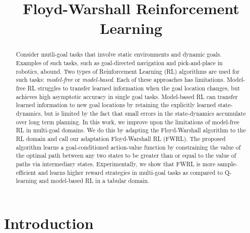 \documentclass[letterpaper]{article} %
\title{Floyd-Warshall Reinforcement Learning}
\begin{document}
\maketitle
\begin{abstract}
Consider mutli-goal tasks that involve static environments and dynamic
goals. Examples of such tasks, such as goal-directed navigation
and pick-and-place in robotics, abound.
Two types of Reinforcement Learning (RL) algorithms are used for
such tasks: 
\emph{model-free} or \emph{model-based}. Each of these approaches has limitations.
Model-free RL struggles to transfer learned information when the goal location
changes, but achieves high asymptotic accuracy in single goal tasks. Model-based
RL can transfer learned information to new goal locations by retaining the
explicitly learned state-dynamics, but is limited by the fact that small errors in
the state-dynamics accumulate over long term planning.
In this work, we improve upon the limitations of model-free RL in
multi-goal domains. 
We do this by adapting the Floyd-Warshall algorithm to
the RL domain and call our adaptation Floyd-Warshall RL (FWRL).
The proposed algorithm learns a goal-conditioned action-value function by 
constraining the value of the
optimal path between any two states to be greater than or equal to the value of
paths via intermediary states.
Experimentally, we show that FWRL is more sample-efficient and learns higher reward strategies in
multi-goal tasks as compared to Q-learning and model-based RL in a
tabular domain.



\end{abstract}


\section{ Introduction}



%








\end{document}
